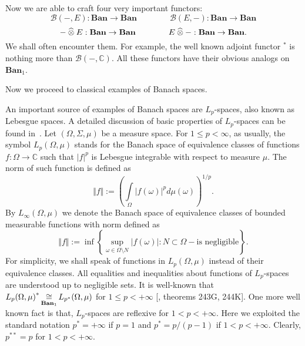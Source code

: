 Now we are able to craft four very important functors:
$$
\mathcal{B}(-,E):\mathbf{Ban}\to\mathbf{Ban}
\qquad\qquad
\mathcal{B}(E,-):\mathbf{Ban}\to\mathbf{Ban}
$$
$$
-\mathbin{\widehat{\otimes}} E:\mathbf{Ban}\to\mathbf{Ban}
\qquad\qquad
E\mathbin{\widehat{\otimes}} -:\mathbf{Ban}\to\mathbf{Ban}.
$$
We shall often encounter them. For example, the well known adjoint functor
${}^*$ is nothing more than $\mathcal{B}(-,\mathbb{C})$. All these functors have
their obvious analogs on $\mathbf{Ban}_1$.

Now we  proceed to classical examples of Banach spaces. 

An important source of examples of Banach spaces are $L_p$-spaces, also known as
Lebesgue spaces. A detailed discussion of basic properties of $L_p$-spaces can
be found in~\cite{CarothShortCourseBanSp}.  Let $(\Omega,\Sigma,\mu)$ be a
measure space.  For $1\leq p<\infty$, as usually, the symbol $L_p(\Omega,\mu)$
stands for the Banach space of equivalence classes of functions
$f:\Omega\to\mathbb{C}$ such that $|f|^p$ is Lebesgue integrable with respect to
measure $\mu$. The norm of such function is defined as
$$
\Vert f\Vert
:={\left(
  \int\limits_{\Omega}{|f(\omega)|}^p d\mu(\omega)
\right)}^{1/p}.
$$ 
By $L_\infty(\Omega,\mu)$ we denote the Banach space of equivalence classes of
bounded measurable functions with norm defined as 
$$
\Vert f\Vert:=\inf\left \{
  \sup_{\omega\in\Omega\setminus N}|f(\omega)|
  :N\subset\Omega - \mbox{is negligible}
\right \}.
$$
For simplicity, we shall speak of functions in $L_p(\Omega,\mu)$ instead of their
equivalence classes. All equalities and inequalities about functions of
$L_p$-spaces are understood up to negligible sets. It is well-known that
${L_p(\Omega,\mu)}^*\mathop{\mathbin{\cong}}\limits_{\mathbf{Ban}_1}L_{p^*}(\Omega,\mu)$ for 
$1\leq p<+\infty$ [\cite{FremMeasTh}, theorems 243G, 244K]. 
One more well known fact is that, $L_p$-spaces are reflexive for 
$1<p<+\infty$. Here we exploited the standard 
notation $p^*=+\infty$ if $p=1$ and $p^*=p/(p-1)$ if $1<p<+\infty$.
Clearly, $p^{**}=p$ for $1<p<+\infty$.

